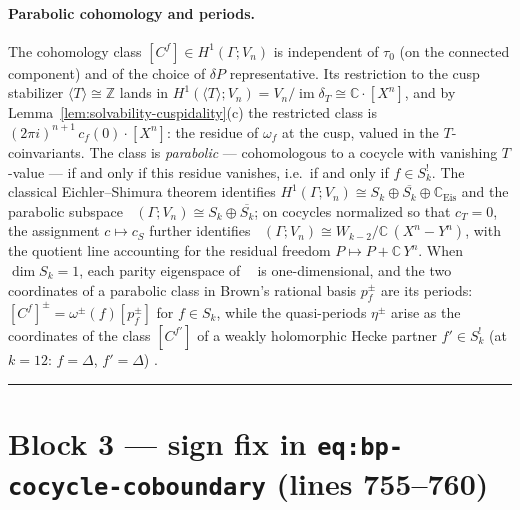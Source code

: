 \documentclass[11pt]{article}
\newcommand{\ZZ}{\mathbb{Z}}
\newcommand{\CC}{\mathbb{C}}
\newcommand{\Dhat}{\widehat{\Delta}}
\DeclareMathOperator{\im}{im}
\DeclareMathOperator{\Hpar}{H^1_{\mathrm{par}}}
\newcommand{\blockrule}{\par\noindent\rule{\textwidth}{0.8pt}\par}
\begin{document}

\paragraph{Parabolic cohomology and periods.}
The cohomology class $[C^f] \in H^1(\Gamma; V_n)$ is independent of
$\tau_0$ (on the connected component) and of the choice of $\delta P$
representative.  Its restriction to the cusp stabilizer
$\langle T \rangle \cong \ZZ$ lands in
$H^1(\langle T \rangle; V_n) = V_n / \im \delta_T \cong \CC\cdot[X^n]$,
and by Lemma~\ref{lem:solvability-cuspidality}(c) the restricted class is
$(2\pi i)^{n+1}\, c_f(0) \cdot [X^n]$: the residue of $\omega_f$ at the
cusp, valued in the $T$-coinvariants.  The class is \emph{parabolic} ---
cohomologous to a cocycle with vanishing $T$-value --- if and only if
this residue vanishes, i.e.\ if and only if $f \in S^!_k$.  The classical
Eichler--Shimura theorem \cite{KZ1984} identifies
$H^1(\Gamma; V_n) \cong S_k \oplus \overline{S_k} \oplus
\CC_{\mathrm{Eis}}$ and the parabolic subspace
$\Hpar(\Gamma; V_n) \cong S_k \oplus \overline{S_k}$; on cocycles
normalized so that $c_T = 0$, the assignment $c \mapsto c_S$ further
identifies $\Hpar(\Gamma; V_n) \cong W_{k-2}/\CC\,(X^n - Y^n)$, with the
quotient line accounting for the residual freedom
$P \mapsto P + \CC\, Y^n$.  When $\dim S_k = 1$, each parity eigenspace
of $\Hpar$ is one-dimensional, and the two coordinates of a parabolic
class in Brown's rational basis $p^\pm_f$ are its periods:
$[C^f]^\pm = \omega^\pm(f)[p^\pm_f]$ for $f \in S_k$, while the
quasi-periods $\eta^\pm$ arise as the coordinates of the class
$[C^{f'}]$ of a weakly holomorphic Hecke partner $f' \in S^!_k$ (at
$k = 12$: $f = \Delta$, $f' = \Dhat$)
\cite{Brown2017}. %


\blockrule

\section*{Block 3 --- sign fix in \texttt{eq:bp-cocycle-coboundary}
(lines 755--760)}
\end{document}

